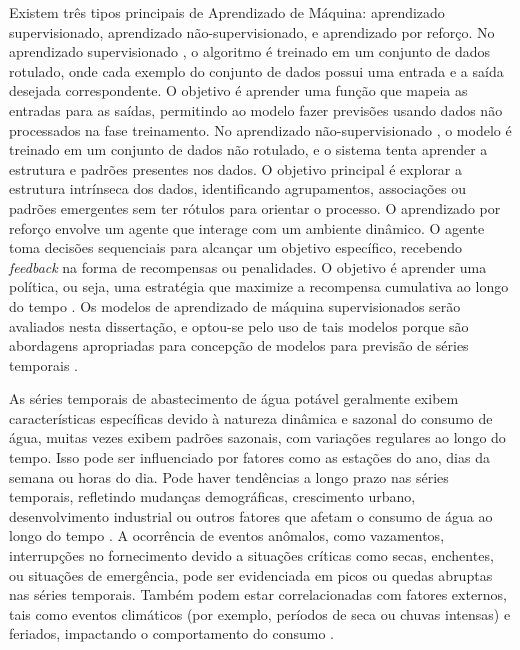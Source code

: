 Existem três tipos principais de Aprendizado de Máquina: aprendizado supervisionado, aprendizado não-supervisionado, e aprendizado por reforço. No aprendizado supervisionado \cite{LIU2023128730}, o algoritmo é treinado em um conjunto de dados rotulado, onde cada exemplo do conjunto de dados possui uma entrada e a saída desejada correspondente. O objetivo é aprender uma função que mapeia as entradas para as saídas, permitindo ao modelo fazer previsões usando dados não processados na fase treinamento. No aprendizado não-supervisionado \cite{WANG2022122747}, o modelo é treinado em um conjunto de dados não rotulado, e o sistema tenta aprender a estrutura e padrões presentes nos dados. O objetivo principal é explorar a estrutura intrínseca dos dados, identificando agrupamentos, associações ou padrões emergentes sem ter rótulos para orientar o processo. O aprendizado por reforço \cite{CHEN2023121710} envolve um agente que interage com um ambiente dinâmico. O agente toma decisões sequenciais para alcançar um objetivo específico, recebendo \textit{feedback} na forma de recompensas ou penalidades. O objetivo é aprender uma política, ou seja, uma estratégia que maximize a recompensa cumulativa ao longo do tempo \cite{Silva2021}. Os modelos de aprendizado de máquina supervisionados serão avaliados nesta dissertação, e optou-se pelo uso de tais modelos porque são abordagens apropriadas para concepção de modelos para previsão de séries temporais \cite{UCCASTILLO2023105788}. 

As séries temporais de abastecimento de água potável geralmente exibem características específicas devido à natureza dinâmica e sazonal do consumo de água, muitas vezes exibem padrões sazonais, com variações regulares ao longo do tempo. Isso pode ser influenciado por fatores como as estações do ano, dias da semana ou horas do dia. Pode haver tendências a longo prazo nas séries temporais, refletindo mudanças demográficas, crescimento urbano, desenvolvimento industrial ou outros fatores que afetam o consumo de água ao longo do tempo \cite{JI2023129928}. A ocorrência de eventos anômalos, como vazamentos, interrupções no fornecimento devido a situações críticas como secas, enchentes, ou situações de emergência, pode ser evidenciada em picos ou quedas abruptas nas séries temporais. Também podem estar correlacionadas com fatores externos, tais como eventos climáticos (por exemplo, períodos de seca ou chuvas intensas) e feriados, impactando o comportamento do consumo \cite{BERGLUND2023104739}.

